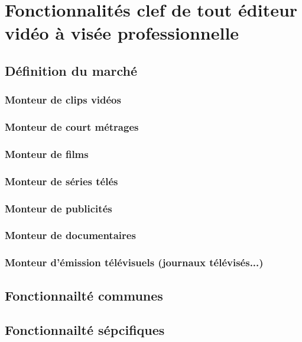 \newpage
\section{Fonctionnalit\'{e}s clef de tout \'{e}diteur vid\'{e}o \`{a} vis\'{e}e
professionnelle}
  \subsection{D\'{e}finition du march\'{e}}
    \subsubsection {Monteur de clips vid\'{e}os}
    \subsubsection {Monteur de court m\'{e}trages}
    \subsubsection {Monteur de films}
    \subsubsection {Monteur de s\'{e}ries t\'{e}l\'{e}s}
    \subsubsection {Monteur de publicit\'{e}s}
    \subsubsection {Monteur de documentaires}
    \subsubsection {Monteur d'\'{e}mission t\'{e}l\'{e}visuels (journaux t\'{e}l\'{e}vis\'{e}s...)}

  \subsection{Fonctionnailt\'{e} communes}
  \subsection{Fonctionnailt\'{e} s\'{e}pcifiques}
